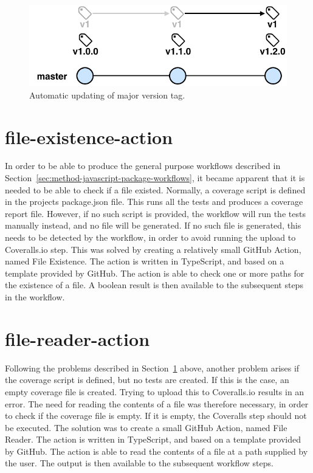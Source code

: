 \begin{figure}[hp]
    \setlength{\abovecaptionskip}{25pt}
    \centering
    \hspace*{-2cm}\includegraphics[page=1,scale=1]{sections/methodology/figures/update-major-tag.pdf}
    \caption{Automatic updating of major version tag.}
    \label{fig:update-major-tag}
\end{figure}

\section{file-existence-action}
\label{sec:method-file-existence-action}
In order to be able to produce the general purpose workflows described in Section~\ref{sec:method-javascript-package-workflows}, it became apparent that it is needed to be able to check if a file existed. Normally, a coverage script is defined in the projects package.json file. This runs all the tests and produces a coverage report file. However, if no such script is provided, the workflow will run the tests manually instead, and no file will be generated. If no such file is generated, this needs to be detected by the workflow, in order to avoid running the upload to Coveralls.io step. This was solved by creating a relatively small GitHub Action, named File Existence. The action is written in TypeScript, and based on a template provided by GitHub. The action is able to check one or more paths for the existence of a file. A boolean result is then available to the subsequent steps in the workflow.

\section{file-reader-action}
\label{sec:method-file-reader-action}
Following the problems described in Section~\ref{sec:method-file-existence-action} above, another problem arises if the coverage script is defined, but no tests are created. If this is the case, an empty coverage file is created. Trying to upload this to Coveralls.io results in an error. The need for reading the contents of a file was therefore necessary, in order to check if the coverage file is empty. If it is empty, the Coveralls step should not be executed. The solution was to create a small GitHub Action, named File Reader. The action is written in TypeScript, and based on a template provided by GitHub. The action is able to read the contents of a file at a path supplied by the user. The output is then available to the subsequent workflow steps.

